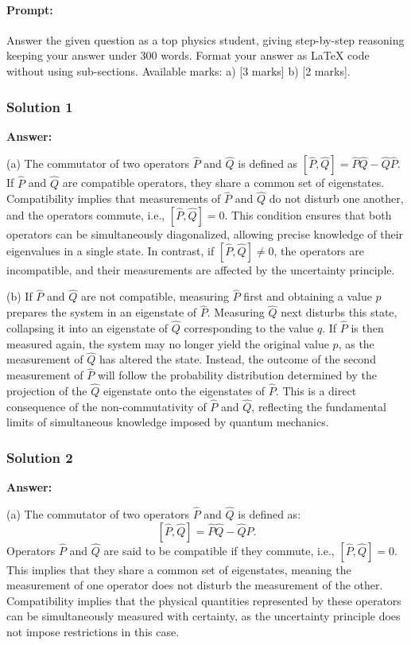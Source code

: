 \documentclass{article}
\begin{document}
\paragraph{Prompt: \\} 
Answer the given question as a top physics student, giving step-by-step reasoning keeping your answer under 300 words. Format your answer as LaTeX code without using sub-sections. Available marks: a) [3 marks] b) [2 marks].

\subsubsection{Solution 1}

\textbf{Answer:}

(a) The commutator of two operators $\hat{P}$ and $\hat{Q}$ is defined as $[\hat{P}, \hat{Q}] = \hat{P}\hat{Q} - \hat{Q}\hat{P}$. If $\hat{P}$ and $\hat{Q}$ are compatible operators, they share a common set of eigenstates. Compatibility implies that measurements of $\hat{P}$ and $\hat{Q}$ do not disturb one another, and the operators commute, i.e., $[\hat{P}, \hat{Q}] = 0$. This condition ensures that both operators can be simultaneously diagonalized, allowing precise knowledge of their eigenvalues in a single state. In contrast, if $[\hat{P}, \hat{Q}] \neq 0$, the operators are incompatible, and their measurements are affected by the uncertainty principle.

(b) If $\hat{P}$ and $\hat{Q}$ are not compatible, measuring $\hat{P}$ first and obtaining a value $p$ prepares the system in an eigenstate of $\hat{P}$. Measuring $\hat{Q}$ next disturbs this state, collapsing it into an eigenstate of $\hat{Q}$ corresponding to the value $q$. If $\hat{P}$ is then measured again, the system may no longer yield the original value $p$, as the measurement of $\hat{Q}$ has altered the state. Instead, the outcome of the second measurement of $\hat{P}$ will follow the probability distribution determined by the projection of the $\hat{Q}$ eigenstate onto the eigenstates of $\hat{P}$. This is a direct consequence of the non-commutativity of $\hat{P}$ and $\hat{Q}$, reflecting the fundamental limits of simultaneous knowledge imposed by quantum mechanics.

\subsubsection{Solution 2}

\textbf{Answer:}

(a) The commutator of two operators $\hat{P}$ and $\hat{Q}$ is defined as:
\[
[\hat{P}, \hat{Q}] = \hat{P}\hat{Q} - \hat{Q}\hat{P}.
\]
Operators $\hat{P}$ and $\hat{Q}$ are said to be compatible if they commute, i.e., $[\hat{P}, \hat{Q}] = 0$. This implies that they share a common set of eigenstates, meaning the measurement of one operator does not disturb the measurement of the other. Compatibility implies that the physical quantities represented by these operators can be simultaneously measured with certainty, as the uncertainty principle does not impose restrictions in this case.
\end{document}
